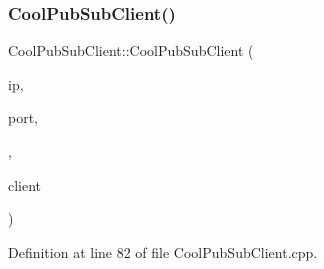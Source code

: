 \subsubsection{\texorpdfstring{Cool\+Pub\+Sub\+Client()}{CoolPubSubClient()}\hspace{0.1cm}{\footnotesize\ttfamily [9/14]}}
{\footnotesize\ttfamily Cool\+Pub\+Sub\+Client\+::\+Cool\+Pub\+Sub\+Client (\begin{DoxyParamCaption}\item[{uint8\+\_\+t $\ast$}]{ip,  }\item[{uint16\+\_\+t}]{port,  }\item[{\hyperlink{class_cool_pub_sub_client_a021ec75e9fbaf658370b8005ccfddc14}{M\+Q\+T\+T\+\_\+\+C\+A\+L\+L\+B\+A\+C\+K\+\_\+\+S\+I\+G\+N\+A\+T\+U\+RE}}]{,  }\item[{Client \&}]{client }\end{DoxyParamCaption})}



Definition at line 82 of file Cool\+Pub\+Sub\+Client.\+cpp.


